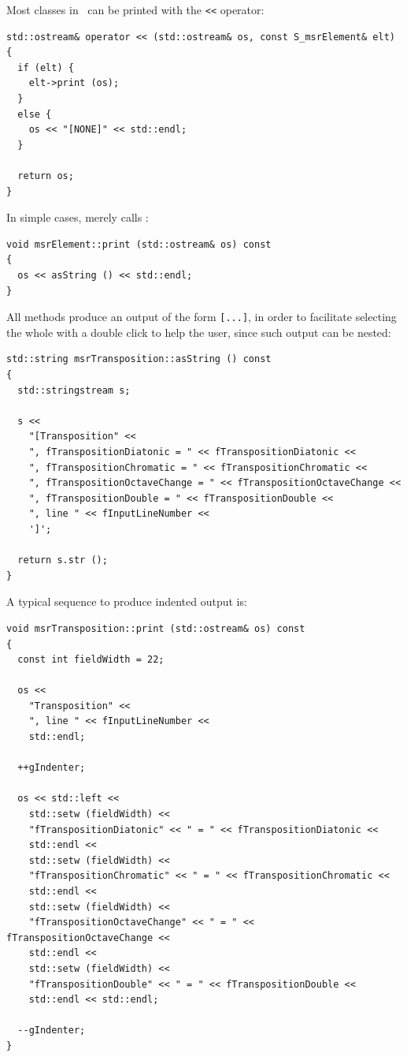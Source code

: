 Most classes in \mf\ can be printed with the {\tt <<} operator:
\begin{lstlisting}[language=CPlusPlus]
std::ostream& operator << (std::ostream& os, const S_msrElement& elt)
{
  if (elt) {
    elt->print (os);
  }
  else {
    os << "[NONE]" << std::endl;
  }

  return os;
}
\end{lstlisting}

In simple cases,  merely calls :
\begin{lstlisting}[language=CPlusPlus]
void msrElement::print (std::ostream& os) const
{
  os << asString () << std::endl;
}
\end{lstlisting}

All  methods produce an output of the form {\tt [...]}, in order to facilitate selecting the whole with a double click to help the user, since such output can be nested:
\begin{lstlisting}[language=CPlusPlus]
std::string msrTransposition::asString () const
{
  std::stringstream s;

  s <<
    "[Transposition" <<
    ", fTranspositionDiatonic = " << fTranspositionDiatonic <<
    ", fTranspositionChromatic = " << fTranspositionChromatic <<
    ", fTranspositionOctaveChange = " << fTranspositionOctaveChange <<
    ", fTranspositionDouble = " << fTranspositionDouble <<
    ", line " << fInputLineNumber <<
    ']';

  return s.str ();
}
\end{lstlisting}

A typical sequence to produce indented output is:
\begin{lstlisting}[language=CPlusPlus]
void msrTransposition::print (std::ostream& os) const
{
  const int fieldWidth = 22;

  os <<
    "Transposition" <<
    ", line " << fInputLineNumber <<
    std::endl;

  ++gIndenter;

  os << std::left <<
    std::setw (fieldWidth) <<
    "fTranspositionDiatonic" << " = " << fTranspositionDiatonic <<
    std::endl <<
    std::setw (fieldWidth) <<
    "fTranspositionChromatic" << " = " << fTranspositionChromatic <<
    std::endl <<
    std::setw (fieldWidth) <<
    "fTranspositionOctaveChange" << " = " << fTranspositionOctaveChange <<
    std::endl <<
    std::setw (fieldWidth) <<
    "fTranspositionDouble" << " = " << fTranspositionDouble <<
    std::endl << std::endl;

  --gIndenter;
}
\end{lstlisting}

